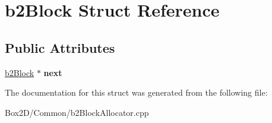 \hypertarget{structb2_block}{}\section{b2\+Block Struct Reference}
\label{structb2_block}
\subsection*{Public Attributes}
\begin{DoxyCompactItemize}
\item 
\mbox{\label{structb2_block_a4b410d4fd7ad2a117c70776f60cb2738}} 
\hyperlink{structb2_block}{b2\+Block} $\ast$ {\bfseries next}
\end{DoxyCompactItemize}


The documentation for this struct was generated from the following file\+:\begin{DoxyCompactItemize}
\item 
Box2\+D/\+Common/b2\+Block\+Allocator.\+cpp\end{DoxyCompactItemize}
